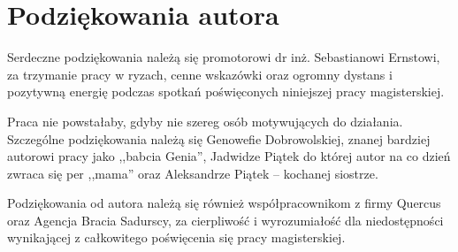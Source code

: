 \chapter{Podziękowania autora}
\label{cha:dodatekB}

Serdeczne podziękowania należą się promotorowi dr inż. Sebastianowi Ernstowi, za trzymanie pracy w ryzach, cenne wskazówki oraz ogromny dystans i pozytywną energię podczas spotkań poświęconych niniejszej pracy magisterskiej.

Praca nie powstałaby, gdyby nie szereg osób motywujących do działania. Szczególne podziękowania należą się Genowefie Dobrowolskiej, znanej bardziej autorowi pracy jako ,,babcia Genia'', Jadwidze Piątek do której autor na co dzień zwraca się per ,,mama'' oraz Aleksandrze Piątek -- kochanej siostrze.

Podziękowania od autora należą się również współpracownikom z firmy Quercus oraz Agencja Bracia Sadurscy, za cierpliwość i wyrozumiałość dla niedostępności wynikającej z całkowitego poświęcenia się pracy magisterskiej.

